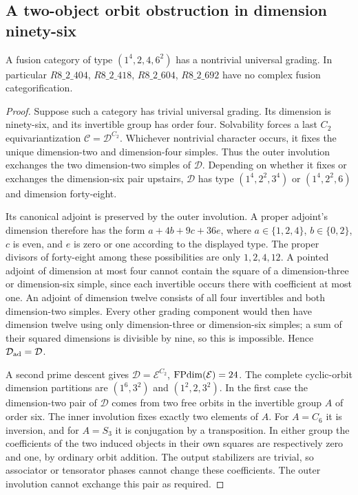 \subsection{A two-object orbit obstruction in dimension ninety-six}
\begin{proposition}\label{prop:d96-pair}
A fusion category of type $(1^4,2,4,6^2)$ has a nontrivial universal
grading. In particular $R8\_2\_404$, $R8\_2\_418$, $R8\_2\_604$, $R8\_2\_692$
have no complex fusion categorification.
\end{proposition}
\begin{proof}
Suppose such a category has trivial universal grading. Its dimension
is ninety-six, and its invertible group has order four. Solvability
forces a last $C_2$
 equivariantization $\mathcal C=\mathcal D^{C_2}$. Whichever nontrivial
character occurs, it fixes the unique dimension-two and dimension-four
simples. Thus the outer involution exchanges the two dimension-two
simples of $\mathcal D$. Depending on whether it fixes or exchanges
the dimension-six pair upstairs, $\mathcal D$ has type
$(1^4,2^2,3^4)$ or $(1^4,2^2,6)$ and dimension forty-eight.

Its canonical adjoint is preserved by the outer involution.
A proper adjoint's dimension therefore has the form
$a+4b+9c+36e$, where $a\in\{1,2,4\}$, $b\in\{0,2\}$,
$c$ is even, and $e$ is zero or one according to the displayed type.
The proper divisors of forty-eight among these possibilities are only
$1,2,4,12$. A pointed adjoint of dimension at most four cannot contain
the square of a dimension-three or dimension-six simple, since each
invertible occurs there with coefficient at most one. An adjoint of
dimension twelve consists of all four invertibles and both
dimension-two simples. Every other grading component would then have
dimension twelve using only dimension-three or dimension-six simples;
a sum of their squared dimensions is divisible by nine, so this is
impossible. Hence $\mathcal D_{\rm ad}=\mathcal D$.

A second prime descent gives $\mathcal D=\mathcal E^{C_2}$,
$\operatorname{FPdim}(\mathcal E)=24$. The complete cyclic-orbit dimension
partitions are $(1^6,3^2)$ and $(1^2,2,3^2)$.
In the first case the dimension-two pair of $\mathcal D$ comes from
two free orbits in the invertible group $A$ of order six.
The inner involution fixes exactly two elements of $A$.
For $A=C_6$ it is inversion, and for $A=S_3$ it is conjugation by a
transposition. In either group the coefficients of the two induced
objects in their own squares are respectively zero and one, by
ordinary orbit addition. The output stabilizers are trivial, so
associator or tensorator phases cannot change these coefficients.
The outer involution cannot exchange this pair as required.


\end{proof}
